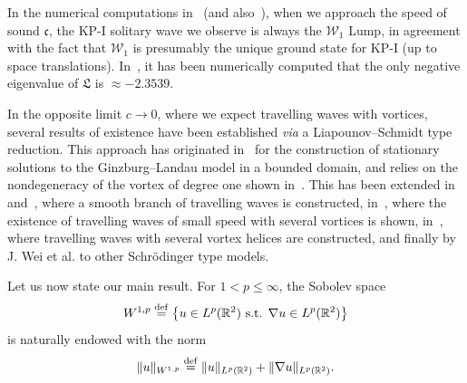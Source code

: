 \documentclass[AHL,Unicode,longabstracts,published]{cedram}
\newcommand*\R{\mathbb R}
\newcommand*\ddef{\stackrel{\rm def}{=}}
\newcommand*\BW{\mathcal{W}}
\newcommand*\cs{{\mathfrak c}}
\newcommand{\fkL}{\mathfrak{L}}
\newcommand*\ii{\infty}
\newcommand*\ls{\leqslant }
\begin{document}
In the numerical computations in~\cite{JR} (and also~\cite{ChiSch15}), when we approach the speed of sound $ \cs $, the KP-I solitary wave we observe is always the $ \BW_1 $ Lump, in agreement with the fact that $ \BW_1 $ is presumably the unique ground state for KP-I (up to space translations). In~\cite{ChiSch_Morse}, it has been numerically computed that the only negative eigenvalue of $ \fkL $ is $ \approx - 2.3539 $.

In the opposite limit $ c \to 0 $, where we expect travelling waves with vortices, several results of existence have been established {\it via} a Liapounov--Schmidt type reduction. This approach has originated in~\cite{delPino_variational} for the construction of stationary solutions to the Ginzburg--Landau model in a bounded domain, and relies on the nondegeneracy of the vortex of degree one shown in~\cite{delPino_vortex}. This has been extended in~\cite{Chi_Pac_2} and~\cite{Chi_Pac_1}, where a smooth branch of travelling waves is constructed, in~\cite{Liu_Wei-multi}, where the existence of travelling waves of small
speed with several vortices is shown, in~\cite{Dav_delPi_Med_Rod}, where travelling waves with several vortex helices are constructed, and finally by J. Wei et al. to other Schr\"odinger type models.



Let us now state our main result. For $ 1 < p \ls \ii $, the Sobolev space
\[
W^{1,p} \ddef \left\{ u \in L^p (\R^2) \text{ s.t. } \nabla u \in L^{p} (\R^2) \right\}
\]
is naturally endowed with the norm
\[
\| u \|_{ W^{1,p} } \ddef
\| u \|_{ L^p (\R^2) } + \| \nabla u \|_{ L^{p} (\R^2) }.
\]
\end{document}
